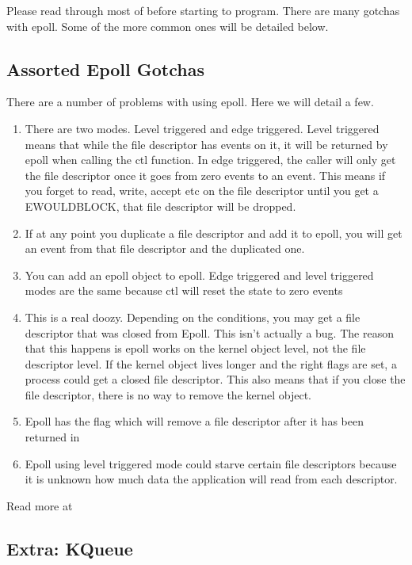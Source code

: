 Please read through most of  before starting to program. There are many gotchas with epoll. Some of the more common ones will be detailed below.

\subsection{Assorted Epoll Gotchas}

There are a number of problems with using epoll. Here we will detail a few.

\begin{enumerate}
\item There are two modes. Level triggered and edge triggered. Level triggered means that while the file descriptor has events on it, it will be returned by epoll when calling the ctl function. In edge triggered, the caller will only get the file descriptor once it goes from zero events to an event.
  This means if you forget to read, write, accept etc on the file descriptor until you get a EWOULDBLOCK, that file descriptor will be dropped.
\item If at any point you duplicate a file descriptor and add it to epoll, you will get an event from that file descriptor and the duplicated one.
\item You can add an epoll object to epoll. Edge triggered and level triggered modes are the same because ctl will reset the state to zero events
\item This is a real doozy. Depending on the conditions, you may get a file descriptor that was closed from Epoll. This isn't actually a bug. The reason that this happens is epoll works on the kernel object level, not the file descriptor level.
  If the kernel object lives longer and the right flags are set, a process could get a closed file descriptor.
  This also means that if you close the file descriptor, there is no way to remove the kernel object.
\item Epoll has the  flag which will remove a file descriptor after it has been returned in 
\item Epoll using level triggered mode could starve certain file descriptors because it is unknown how much data the application will read from each descriptor.
\end{enumerate}

Read more at 

\subsection{Extra: KQueue}

